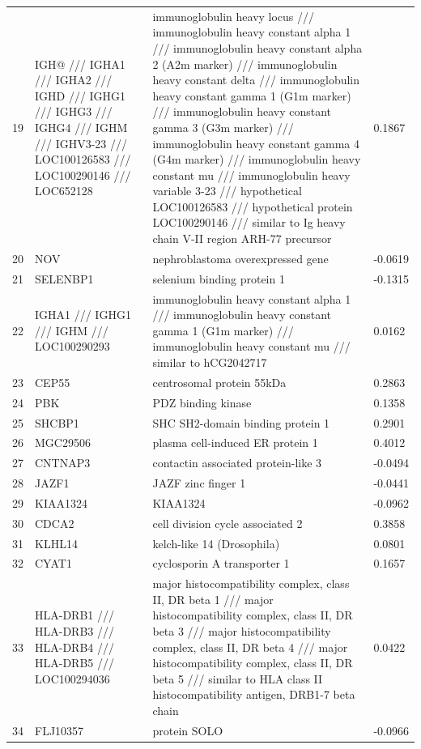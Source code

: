 \begin{longtable}{| l | p{4cm} | p{8cm} | l |}
  19 & IGH@ /// IGHA1 /// IGHA2 /// IGHD /// IGHG1 /// IGHG3 /// IGHG4 /// IGHM /// IGHV3-23 /// LOC100126583 /// LOC100290146 /// LOC652128 & immunoglobulin heavy locus /// immunoglobulin heavy constant alpha 1 /// immunoglobulin heavy constant alpha 2 (A2m marker) /// immunoglobulin heavy constant delta /// immunoglobulin heavy constant gamma 1 (G1m marker) /// immunoglobulin heavy constant gamma 3 (G3m marker) /// immunoglobulin heavy constant gamma 4 (G4m marker) /// immunoglobulin heavy constant mu /// immunoglobulin heavy variable 3-23 /// hypothetical LOC100126583 /// hypothetical protein LOC100290146 /// similar to Ig heavy chain V-II region ARH-77 precursor & 0.1867 \\ 
  20 & NOV & nephroblastoma overexpressed gene & -0.0619 \\ 
  21 & SELENBP1 & selenium binding protein 1 & -0.1315 \\ 
  22 & IGHA1 /// IGHG1 /// IGHM /// LOC100290293 & immunoglobulin heavy constant alpha 1 /// immunoglobulin heavy constant gamma 1 (G1m marker) /// immunoglobulin heavy constant mu /// similar to hCG2042717 & 0.0162 \\ 
  23 & CEP55 & centrosomal protein 55kDa & 0.2863 \\ 
  24 & PBK & PDZ binding kinase & 0.1358 \\ 
  25 & SHCBP1 & SHC SH2-domain binding protein 1 & 0.2901 \\ 
  26 & MGC29506 & plasma cell-induced ER protein 1 & 0.4012 \\ 
  27 & CNTNAP3 & contactin associated protein-like 3 & -0.0494 \\ 
  28 & JAZF1 & JAZF zinc finger 1 & -0.0441 \\ 
  29 & KIAA1324 & KIAA1324 & -0.0962 \\ 
  30 & CDCA2 & cell division cycle associated 2 & 0.3858 \\ 
  31 & KLHL14 & kelch-like 14 (Drosophila) & 0.0801 \\ 
  32 & CYAT1 & cyclosporin A transporter 1 & 0.1657 \\ 
  33 & HLA-DRB1 /// HLA-DRB3 /// HLA-DRB4 /// HLA-DRB5 /// LOC100294036 & major histocompatibility complex, class II, DR beta 1 /// major histocompatibility complex, class II, DR beta 3 /// major histocompatibility complex, class II, DR beta 4 /// major histocompatibility complex, class II, DR beta 5 /// similar to HLA class II histocompatibility antigen, DRB1-7 beta chain & 0.0422 \\ 
  34 & FLJ10357 & protein SOLO & -0.0966 \\ 
   \hline
\end{longtable}

